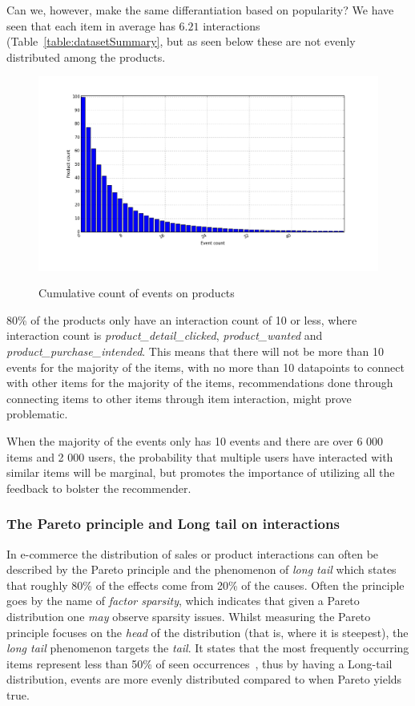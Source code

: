 Can we, however, make the same differantiation based on popularity? We have
seen that each item in average has $6.21$ interactions
(Table~\ref{table:datasetSummary}, but as seen below these are not evenly
distributed among the products.

\begin{figure}[H]
  \centering
  \includegraphics[width=\dualGraphWidth]{image/product_idcumdistribution.png}
  \label{figure:eventsPerproductCum}
  \caption{Cumulative count of events on products}
\end{figure}

80\% of the products only have an interaction count of 10 or less, where
interaction count is \emph{product\_detail\_clicked}, \emph{product\_wanted}
and \emph{product\_purchase\_intended}.  This means that there will not be more
than 10 events for the majority of the items, with no more than 10 datapoints
to connect with other items for the majority of the items, recommendations done
through connecting items to other items through item interaction, might prove
problematic.

When the majority of the events only has 10 events and there are over 6 000
items and 2 000 users, the probability that multiple users have interacted with
similar items will be marginal, but promotes the importance of utilizing all
the feedback to bolster the recommender.

\subsubsection{The Pareto principle and Long tail on interactions}

In e-commerce the distribution of sales or product interactions can often be
described by the Pareto principle and the phenomenon of \textit{long tail}
which states that roughly 80\% of the effects come from 20\% of the causes.
Often the principle goes by the name of \textit{factor sparsity}, which
indicates that given a Pareto distribution one \textit{may} observe sparsity
issues. Whilst measuring the Pareto principle focuses on the \textit{head} of
the distribution (that is, where it is steepest), the \textit{long tail}
phenomenon targets the \textit{tail}. It states that the most frequently
occurring items represent less than 50\% of seen
occurrences~\cite{DBLP:journals/corr/abs-1203-4487}, thus by having a Long-tail
distribution, events are more evenly distributed compared to when Pareto yields
true.

